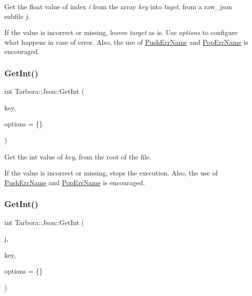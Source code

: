 Get the float value of index {\itshape i} from the array {\itshape key} into {\itshape taget}, from a raw\+\_\+json subfile {\itshape j}. 

If the value is incorrect or missing, leaves {\itshape target} as is. Use {\itshape options} to configure what happens in case of error. Also, the use of \hyperlink{classTarbora_1_1Json_a061eac4f16dac3b9b3a26a66de0ea8f0}{Push\+Err\+Name} and \hyperlink{classTarbora_1_1Json_a14019f06d3bd76edd6a6e78134519d11}{Pop\+Err\+Name} is encouraged. \mbox{\label{classTarbora_1_1Json_a345c02e8aebe8402c5cb4590ace0e340}} 
\subsubsection{\texorpdfstring{Get\+Int()}{GetInt()}\hspace{0.1cm}{\footnotesize\ttfamily [1/3]}}
{\footnotesize\ttfamily int Tarbora\+::\+Json\+::\+Get\+Int (\begin{DoxyParamCaption}\item[{const char $\ast$}]{key,  }\item[{\hyperlink{structTarbora_1_1JsonOptions}{Json\+Options}}]{options = {\ttfamily \{\}} }\end{DoxyParamCaption})}



Get the int value of {\itshape key}, from the root of the file. 

If the value is incorrect or missing, stops the execution. Also, the use of \hyperlink{classTarbora_1_1Json_a061eac4f16dac3b9b3a26a66de0ea8f0}{Push\+Err\+Name} and \hyperlink{classTarbora_1_1Json_a14019f06d3bd76edd6a6e78134519d11}{Pop\+Err\+Name} is encouraged. \mbox{\label{classTarbora_1_1Json_ac912f15cc268d126884c5a192bf6021c}} 
\subsubsection{\texorpdfstring{Get\+Int()}{GetInt()}\hspace{0.1cm}{\footnotesize\ttfamily [2/3]}}
{\footnotesize\ttfamily int Tarbora\+::\+Json\+::\+Get\+Int (\begin{DoxyParamCaption}\item[{raw\+\_\+json}]{j,  }\item[{const char $\ast$}]{key,  }\item[{\hyperlink{structTarbora_1_1JsonOptions}{Json\+Options}}]{options = {\ttfamily \{\}} }\end{DoxyParamCaption})}



